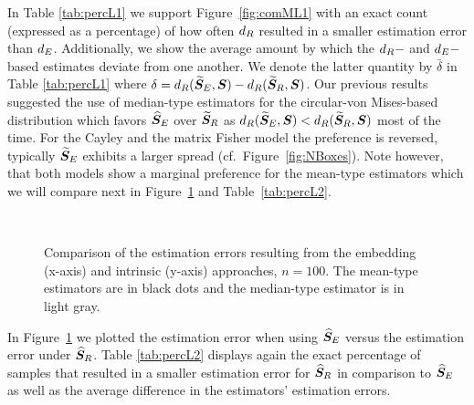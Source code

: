 \noindent In Table \ref{tab:percL1} we support Figure~\ref{fig:comML1} with an exact count (expressed as a percentage) of how often ${d_R}$ resulted in a smaller estimation error than ${d_E}$.  Additionally, we show the average amount by which the ${d_R}-$ and ${d_E}-$based estimates deviate from one another.  We denote the latter quantity by $\bar\delta$ in Table \ref{tab:percL1} where  $\delta={d_R}({\widetilde{\bm S}_E},\bm S)-{d_R}({\widetilde{\bm S}_R},\bm S)$.    
Our previous results suggested the use of median-type estimators for the circular-von Mises-based distribution which favors ${\widehat{\bm S}_E}$ over ${\widetilde{\bm S}_R}$ as ${d_R}({\widetilde{\bm S}_E},\bm S) < {d_R}({\widetilde{\bm S}_R},\bm S)$ most of the time.  For the Cayley and the matrix Fisher model the preference is reversed, typically  ${\widetilde{\bm S}_E}$ exhibits a larger spread (cf.~Figure~\ref{fig:NBoxes}). Note however, that both models show a marginal preference for the mean-type estimators which we will compare next in Figure~\ref{fig:comPL2} and Table~\ref{tab:percL2}.


\begin{figure}[h]
\centering
{}\\
\caption{Comparison of the estimation errors resulting from the embedding (x-axis) and intrinsic (y-axis) approaches, $n=100$.  The mean-type estimators are in black dots and the median-type estimator is in light gray.}
\label{fig:comPL2}
\end{figure}

In Figure~\ref{fig:comPL2} we plotted the estimation error when using ${\widehat{\bm S}_E}$ versus the estimation error under ${\widehat{\bm S}_R}$. Table \ref{tab:percL2} displays again the exact percentage of samples that resulted in a smaller estimation error for ${\widehat{\bm S}_R}$ in comparison to ${\widehat{\bm S}_E}$ as well as the average difference in the estimators' estimation errors.

